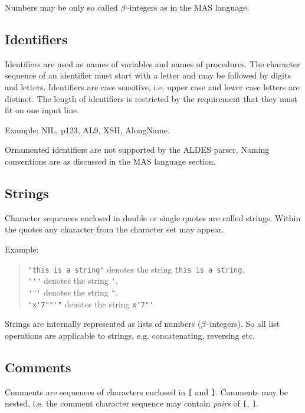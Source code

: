Numbers may be only so called $\beta$--integers  
as in the MAS language.

\subsection{Identifiers}

Identifiers are used as names of variables and names of 
procedures. 
The character sequence of an identifier
must start with a letter and may be 
followed by digits and letters.
Identifiers are case sensitive, i.e. upper case
and lower case letters are distinct.
The length of identifiers is restricted by the 
requirement that they must fit on one input line.

Example: NIL, p123, AL9, XSH, AlongName.

Ornamented identifiers are not supported by the ALDES parser. 
Naming conventions are as discussed in the MAS language section. 

\subsection{Strings}

Character sequences enclosed in double or single quotes
are called strings.
Within the quotes any character from the character set
may appear. 

Example:
\begin{quote}
       \verb/"this is a string"/ denotes the string
       \verb/this is a string/, \\
       \verb/"'"/ denotes the string \verb/'/, \\
       \verb/'"'/ denotes the string \verb/"/, \\
       \verb/"x'7""'"/ denotes the string \verb/x'7"'/
\end{quote} 

Strings are internally represented as lists of numbers 
($\beta$--integers). So all list operations are applicable to
strings, e.g. concatenating, reversing etc.
 

\subsection{Comments}

Comments are sequences of characters enclosed in
\verb/[/ and \verb/]/.
Comments may be nested, i.e. the comment character sequence may
contain {\em pairs} of \verb/[/, \verb/]/.
\index{\verb/[/}\index{\verb/]/}

